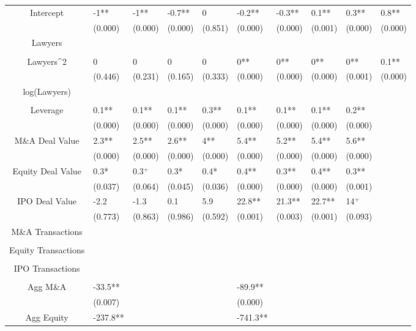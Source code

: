 \documentclass{article}
\begin{document}
\begin{table}[H]
\begin{tabular}{|clllllllll|}
Intercept & -1** & -1** & -0.7** & 0 & -0.2** & -0.3** & 0.1** & 0.3** & 0.8** \\
   & (0.000) & (0.000) & (0.000) & (0.851) & (0.000) & (0.000) & (0.001) & (0.000) & (0.000) \\
  Lawyers &  &  &  &  &  &  &  &  &  \\
   &  &  &  &  &  &  &  &  &  \\
  Lawyers^2 & 0 & 0 & 0 & 0 & 0** & 0** & 0** & 0** & 0.1** \\
   & (0.446) & (0.231) & (0.165) & (0.333) & (0.000) & (0.000) & (0.000) & (0.001) & (0.000) \\
  log(Lawyers) &  &  &  &  &  &  &  &  &  \\
   &  &  &  &  &  &  &  &  &  \\
  Leverage & 0.1** & 0.1** & 0.1** & 0.3** & 0.1** & 0.1** & 0.1** & 0.2** &  \\
   & (0.000) & (0.000) & (0.000) & (0.000) & (0.000) & (0.000) & (0.000) & (0.000) &  \\
  M\&A Deal Value & 2.3** & 2.5** & 2.6** & 4** & 5.4** & 5.2** & 5.4** & 5.6** &  \\
   & (0.000) & (0.000) & (0.000) & (0.000) & (0.000) & (0.000) & (0.000) & (0.000) &  \\
  Equity Deal Value & 0.3* & 0.3$^{+}$ & 0.3* & 0.4* & 0.4** & 0.3** & 0.4** & 0.3** &  \\
   & (0.037) & (0.064) & (0.045) & (0.036) & (0.000) & (0.000) & (0.000) & (0.001) &  \\
  IPO Deal Value & -2.2 & -1.3 & 0.1 & 5.9 & 22.8** & 21.3** & 22.7** & 14$^{+}$ &  \\
   & (0.773) & (0.863) & (0.986) & (0.592) & (0.001) & (0.003) & (0.001) & (0.093) &  \\
  M\&A Transactions &  &  &  &  &  &  &  &  &  \\
   &  &  &  &  &  &  &  &  &  \\
  Equity Transactions &  &  &  &  &  &  &  &  &  \\
   &  &  &  &  &  &  &  &  &  \\
  IPO Transactions &  &  &  &  &  &  &  &  &  \\
   &  &  &  &  &  &  &  &  &  \\
  Agg M\&A & -33.5** &  &  &  & -89.9** &  &  &  &  \\
   & (0.007) &  &  &  & (0.000) &  &  &  &  \\
  Agg Equity & -237.8** &  &  &  & -741.3** &  &  &  &  \\

\end{tabular}
\end{table}
\end{document}
